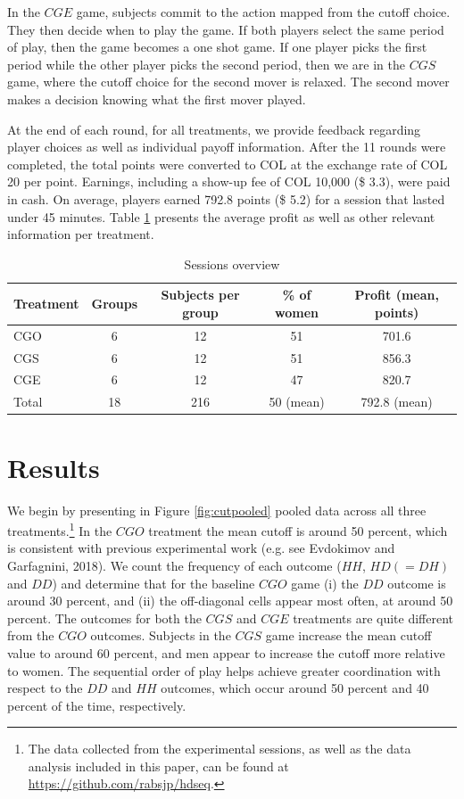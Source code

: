 \documentclass[11pt, letterpaper]{article}
\theoremstyle{plain}
\begin{document}
In the $CGE$ game, subjects commit to the action mapped from the cutoff choice. They then decide when to play the game. If both players select the same period of play, then the game becomes a one shot game. If one player picks the first period while the other player picks the second period, then we are in the $CGS$ game, where the cutoff choice for the second mover is relaxed. The second mover makes a decision knowing what the first mover played. 

At the end of each round, for all treatments, we provide feedback regarding player choices as well as individual payoff information. After the 11 rounds were completed, the total points were converted to COL at the exchange rate of COL 20 per point. Earnings, including a show-up fee of COL 10,000 (\$ 3.3), were paid in cash. On average, players earned 792.8 points (\$ 5.2) for a session that lasted under 45 minutes. Table \ref{session} presents the average profit as well as other relevant information per treatment. 

\begin{table}[ht]
\centering
\caption{Sessions overview }
\hline
\begin{tabular}{lcccc}
  Treatment & Groups & Subjects per group & \% of women & Profit (mean, points)\\
  \hline  
  CGO & 6 & 12 & 51 & 701.6 \\
  CGS & 6 & 12 & 51 & 856.3 \\
  CGE & 6 & 12 & 47 & 820.7 \\
\hline
Total & 18 & 216 &  50 (mean) & 792.8 (mean)\\
\end{tabular}

\label{session}
\end{table}




\section{Results}
\label{sec:results}

We begin by presenting in Figure \ref{fig:cutpooled} pooled data across all three treatments.\footnote{The data collected from the experimental sessions, as well as the data analysis included in this paper, can be found at \url{https://github.com/rabsjp/hdseq}.} In the $CGO$ treatment the mean cutoff is around 50 percent, which is consistent with previous experimental work (e.g. see Evdokimov and Garfagnini, 2018). We count the frequency of each outcome ($HH$, $HD (=DH)$ and $DD$) and determine that for the baseline $CGO$ game (i) the $DD$ outcome is around 30 percent, and (ii) the off-diagonal cells appear most often, at around 50 percent. The outcomes for both the $CGS$ and $CGE$ treatments are quite different from the $CGO$ outcomes. Subjects in the $CGS$ game increase the mean cutoff value to around 60 percent, and men appear to increase the cutoff more relative to women. The sequential order of play helps achieve greater coordination with respect to the $DD$ and $HH$ outcomes, which occur around 50 percent and 40 percent of the time, respectively. 
\end{document}
